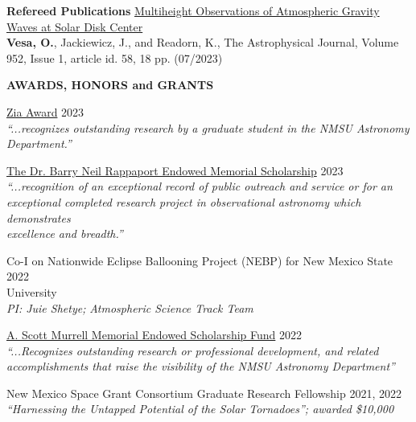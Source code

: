 \documentclass{resume} %
\begin{document}

\vspace{-0.1in}
\begin{rSection}{\textbf{Refereed Publications}}
\vspace{0.02in}
\href{https://iopscience.iop.org/article/10.3847/1538-4357/acd930}{Multiheight Observations of Atmospheric Gravity Waves at Solar Disk Center} \\ {\bf Vesa, O.}, Jackiewicz, J., and Readorn, K., The Astrophysical Journal, Volume 952, Issue 1, article id. 58, 18 pp. (07/2023)
\end{rSection} 


\vspace{-0.1in}
\begin{rSection}{\textbf{AWARDS, HONORS and GRANTS}}
\vspace{0.02in}

{\href{https://astro.nmsu.edu/fellowships/zia.html}{Zia Award}}
\hfill{2023} \\
\emph{``...recognizes outstanding research by a graduate student in the NMSU Astronomy \\ Department.''}


{\href{https://astro.nmsu.edu/fellowships/rappaport.html}{The Dr. Barry Neil Rappaport Endowed Memorial Scholarship}}
\hfill{2023} \\
\emph{``...recognition of an exceptional record of public outreach and service or for an \\ exceptional completed research project in observational astronomy which demonstrates \\ excellence and breadth.''}

{Co-I on Nationwide Eclipse Ballooning Project (NEBP) for New Mexico State \hfill{2022} \\ University} \\
\emph{PI: Juie Shetye;} \emph{Atmospheric Science Track Team}

{\href{https://astro.nmsu.edu/fellowships/murrell.html}{A. Scott Murrell Memorial Endowed Scholarship Fund}}
\hfill{2022} \\
\emph{``...Recognizes outstanding research or professional development, and related \\ accomplishments that raise the visibility of the NMSU Astronomy Department''}

{New Mexico Space Grant Consortium Graduate Research Fellowship } \hfill{2021, 2022} \\
\emph{``Harnessing the Untapped Potential of the Solar Tornadoes''; awarded \$10,000}
\end{rSection}
\newpage
\end{document}

